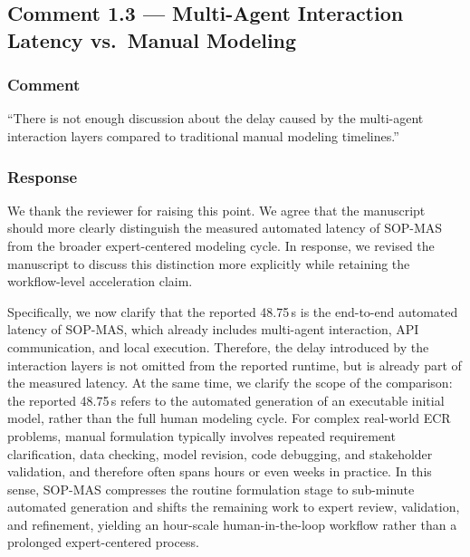 \documentclass[11pt,a4paper]{article}
\begin{document}
\subsection{Comment 1.3 --- Multi-Agent Interaction Latency vs.\ Manual Modeling}

\subsubsection{Comment}
``There is not enough discussion about the delay caused by the multi-agent interaction layers compared to traditional manual modeling timelines.''

\subsubsection{Response}
We thank the reviewer for raising this point. We agree that the manuscript should more clearly distinguish the measured automated latency of SOP-MAS from the broader expert-centered modeling cycle. In response, we revised the manuscript to discuss this distinction more explicitly while retaining the workflow-level acceleration claim.

Specifically, we now clarify that the reported 48.75\,s is the end-to-end automated latency of SOP-MAS, which already includes multi-agent interaction, API communication, and local execution. Therefore, the delay introduced by the interaction layers is not omitted from the reported runtime, but is already part of the measured latency. At the same time, we clarify the scope of the comparison: the reported 48.75\,s refers to the automated generation of an executable initial model, rather than the full human modeling cycle. For complex real-world ECR problems, manual formulation typically involves repeated requirement clarification, data checking, model revision, code debugging, and stakeholder validation, and therefore often spans hours or even weeks in practice. In this sense, SOP-MAS compresses the routine formulation stage to sub-minute automated generation and shifts the remaining work to expert review, validation, and refinement, yielding an hour-scale human-in-the-loop workflow rather than a prolonged expert-centered process.
\end{document}
